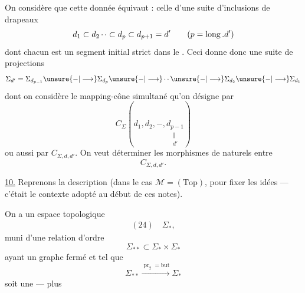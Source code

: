 
On considère que cette donnée équivaut : celle d'une
suite d'inclusions de drapeaux
\[
 d_1\subset d_2\mathinner{\cdotp\cdotp}\subset d_p\subset d_{p+1}=d'
 \qquad(p=\operatorname{long}.d')
\]
dont chacun est un segment initial strict dans
le .
Ceci donne donc  une
suite de projections
\[
 \Sigma_{d'}=\Sigma_{d_{p-1}}\unsure{-|\longrightarrow}\Sigma_{d_p}
 \unsure{-|\longrightarrow}\mathinner{\cdotp\cdotp}\unsure{-|\longrightarrow}\Sigma_{d_2}
 \unsure{-|\longrightarrow}\Sigma_{d_1}
\]
dont on considère le mapping-cône simultané
qu'on désigne par
\[
 C_\Sigma(d_1,d_2,-,
 \underset{\substack{\Vert\\d'}}{d_{p-1}})
\]
ou aussi par \(C_{\Sigma,d,d'}\).
On veut déterminer les
morphismes de  naturels entre
\[
 C_{\Sigma,d,d'}.
\]



\uline{10.} Reprenons la description 
(dans le cas \(\mathcal M=(\mathrm{Top})\), pour fixer les idées
--- c'était le contexte adopté au début de ces notes).

On a un espace topologique
\[
 \begin{array}{|c|}\hline
 (24)\quad\Sigma_*,
 \end{array}
\]
muni d'une relation d'ordre
\[
 \Sigma_{**}\subset\Sigma_*\times\Sigma_*
\]
ayant un graphe fermé\unsure{;|,} et tel que
\[
 \Sigma_{**}\xrightarrow{\operatorname{pr}_2=\mathrm{but}}\Sigma_*
\]
soit une  --- plus

